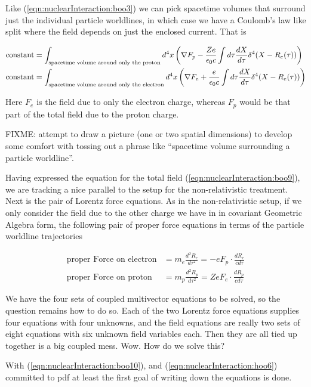 Like (\ref{eqn:nuclearInteraction:boo3}) we can pick spacetime volumes that surround just the individual particle worldlines, in which case we have a Coulomb's law like split where the field depends on just the enclosed current.  That is

\begin{align}\label{eqn:nuclearInteraction:boo10}
\text{constant} &= \int_{\text{spacetime volume around only the proton}} d^4 x \left( \nabla F_p - \frac{Z e}{\epsilon_0 c} \int d\tau \frac{dX}{d\tau} \delta^4 (X - R_e(\tau)) \right) \\
\text{constant} &= \int_{\text{spacetime volume around only the electron}} d^4 x \left( \nabla F_e + \frac{e}{\epsilon_0 c} \int d\tau \frac{dX}{d\tau} \delta^4 (X - R_e(\tau)) \right)
\end{align}

Here $F_e$ is the field due to only the electron charge, whereas $F_p$ would be that part of the total field due to the proton charge.

FIXME: attempt to draw a picture (one or two spatial dimensions) to develop some comfort with tossing out a phrase like ``spacetime volume surrounding a particle worldline''.

Having expressed the equation for the total field (\ref{eqn:nuclearInteraction:boo9}), we are tracking a nice parallel to the setup for the non-relativistic treatment.  Next is the pair of Lorentz force equations.  As in the non-relativistic setup, if we only consider the field due to the other charge we have in 
in covariant Geometric Algebra form, the following pair of proper force equations in terms of the particle worldline trajectories

\begin{align}\label{eqn:nuclearInteraction:hoo6}
\text{proper Force on electron} &= m_e \frac{d^2 R_e}{d\tau^2} = - e F_p \cdot \frac{d R_e}{c d\tau} \\
\text{proper Force on proton} &= m_p \frac{d^2 R_p}{d\tau^2} = Z e F_e \cdot \frac{d R_p}{c d\tau}
\end{align}

We have the four sets of coupled multivector equations to be solved, so the question remains how to do so.  Each of the two Lorentz force equations supplies four equations with four unknowns, and the field equations are really two sets of eight equations with six unknown field variables each.  Then they are all tied up together is a big coupled mess.  Wow.  How do we solve this?

With (\ref{eqn:nuclearInteraction:boo10}), and (\ref{eqn:nuclearInteraction:hoo6}) committed to pdf at least the first goal of writing down the equations is done.

